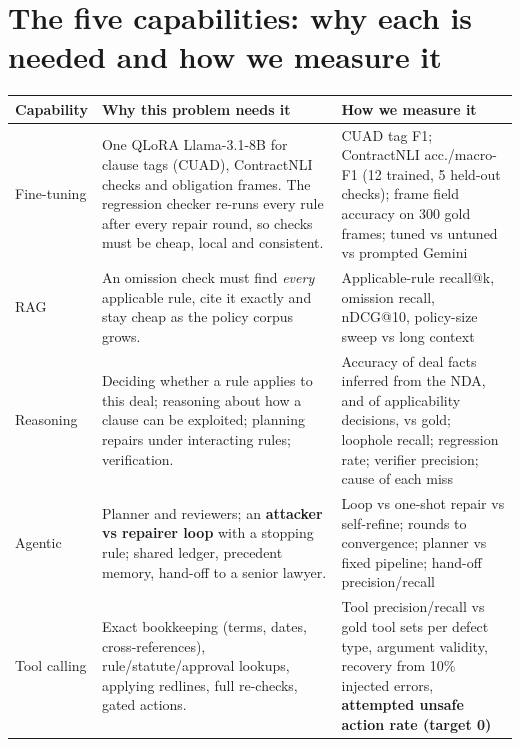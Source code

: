 \documentclass[11pt,a4paper]{article}
\begin{document}
\section{The five capabilities: why each is needed and how we measure it}
\begin{table}[H]\footnotesize
\begin{tabularx}{\textwidth}{@{}p{2.1cm}LL@{}}
\toprule
\textbf{Capability} & \textbf{Why this problem needs it} & \textbf{How we measure it} \\
\midrule
Fine-tuning & One QLoRA Llama-3.1-8B for clause tags (CUAD), ContractNLI checks and obligation frames. The regression checker re-runs every rule after every repair round, so checks must be cheap, local and consistent. & CUAD tag F1; ContractNLI acc./macro-F1 (12 trained, 5 held-out checks); frame field accuracy on 300 gold frames; tuned vs untuned vs prompted Gemini \\
RAG & An omission check must find \emph{every} applicable rule, cite it exactly and stay cheap as the policy corpus grows. & Applicable-rule recall@k, omission recall, nDCG@10, policy-size sweep vs long context \\
Reasoning & Deciding whether a rule applies to this deal; reasoning about how a clause can be exploited; planning repairs under interacting rules; verification. & Accuracy of deal facts inferred from the NDA, and of applicability decisions, vs gold; loophole recall; regression rate; verifier precision; cause of each miss \\
Agentic & Planner and reviewers; an \textbf{attacker vs repairer loop} with a stopping rule; shared ledger, precedent memory, hand-off to a senior lawyer. & Loop vs one-shot repair vs self-refine; rounds to convergence; planner vs fixed pipeline; hand-off precision/recall \\
Tool calling & Exact bookkeeping (terms, dates, cross-references), rule/statute/approval lookups, applying redlines, full re-checks, gated actions. & Tool precision/recall vs gold tool sets per defect type, argument validity, recovery from 10\% injected errors, \textbf{attempted unsafe action rate (target 0)} \\
\bottomrule
\end{tabularx}
\end{table}

\end{document}
